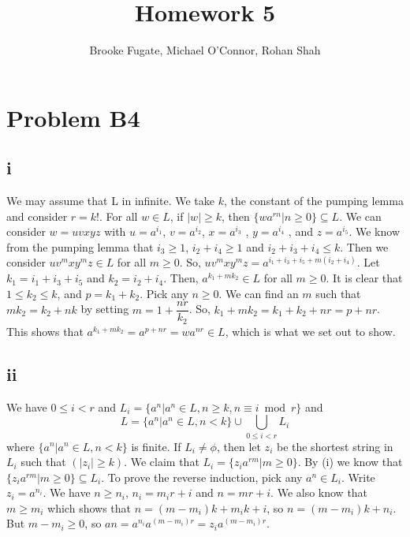 \documentclass[12pt]{article}
\begin{document}
\pagestyle{plain}
\titleformat{\subsection}[runin]
  {\normalfont\large\bfseries}{\thesubsection}{1em}{}

\title{Homework 5}
\author{Brooke Fugate, Michael O'Connor, Rohan Shah}
\date{}

\maketitle

\section*{Problem B4}
\subsection*{i}
We may assume that L in infinite. We take $k$, the constant of the pumping lemma and consider $r = k!$. For all $w \in L$, if $|w| \ge k$, then $\{wa^{rn} | n \ge 0 \} \subseteq L$. \newline 
We can consider $w=uvxyz$ with $u=a^{i_1}$, $v=a^{i_2}$, $x=a^{i_3}$ , $y=a^{i_4}$ , and $z=a^{i_5}$. We know from the pumping lemma that $i_3 \ge 1$, $i_2 + i_4 \ge 1$ and $i_2 + i_3 + i_4 \le k$. Then we consider $uv^mxy^mz \in L$ for all $m \ge 0$.  So, $uv^mxy^mz = a^{i_1+i_3+i_5 + m(i_2 + i_4)}$. Let $k_1 = i_1 + i_3 + i_5$ and $k_2 = i_2 + i_4$. Then, $a^{k_1 + mk_2} \in L$ for all $m \ge 0$. It is clear that $1 \le k_2 \le k$, and $p=k_1+k_2$. Pick any $n \ge 0$. We can find an $m$ such that $mk_2=k_2 +nk$ by setting $m=1+ \dfrac{nr}{k_2}$. So, $k_1+mk_2=k_1+k_2+nr=p+nr$. This shows that $a^{k_1+mk_2}=a^{p+nr}=wa^{nr} \in L$, which is what we set out to show. 
\subsection*{ii}
We have $0 \le i < r$ and $L_i = \{a^n |a^n \in L, n \ge k , n \equiv i \bmod r \}$ and 
$$L = \{ a^n | a^n \in L , n < k\} \cup \bigcup_{0 \le i < r} L_i$$ where $\{ a^n | a^n \in L , n < k\}$ is finite. If $L_i \neq \phi$, then let $z_i$ be the shortest string in $L_i$ such that $(|z_i| \ge k)$. We claim that $L_i = \{z_i a^{rm} | m \ge 0\}$. By (i) we know that $\{z_i a^{rm} | m \ge 0\} \subseteq L_i$. To prove the reverse induction, pick any $a^n \in L_i$. Write $z_i = a^{n_i}$. We have $n \ge n_i$, $n_i = m_ir + i$ and $n=mr +i$. We also know that $m \ge m_i$ which shows that $n=(m-m_i)k + m_ik + i$, so $n=(m-m_i)k + n_i$. But $m-m_i \ge 0$, so $an=a^{n_i}a^{(m-m_i)r}=z_ia^{(m-m_i)r}$.  
\end{document}
